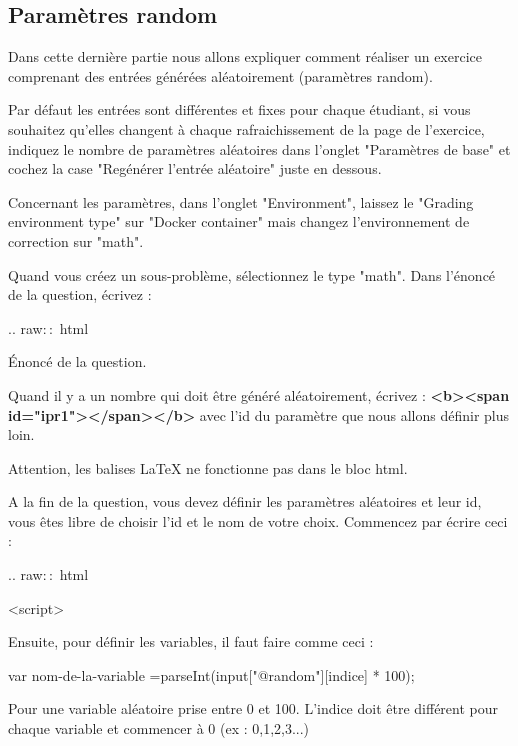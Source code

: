 \documentclass{article}
\begin{document}
\newpage
\subsection{Paramètres random}\label{random}

Dans cette dernière partie nous allons expliquer comment réaliser un exercice comprenant des entrées générées aléatoirement (paramètres random). 
\bigskip

Par défaut les entrées sont différentes et fixes pour chaque étudiant, si vous souhaitez qu'elles changent à chaque rafraichissement de la page de l'exercice, indiquez le nombre de paramètres aléatoires dans l'onglet "Paramètres de base" et cochez la case "Regénérer l'entrée aléatoire" juste en dessous.
\bigskip

Concernant les paramètres, dans l'onglet "Environment", laissez le "Grading environment type" sur "Docker container" mais changez l'environnement de correction sur "math". 

Quand vous créez un sous-problème, sélectionnez le type "math". Dans l'énoncé de la question, écrivez :
\bigskip

.. raw${::}$ html

\bigskip
\hspace{1cm} Énoncé de la question. 

\bigskip
Quand il y a un nombre qui doit être généré aléatoirement, écrivez : \textbf{<b><span id="ipr1"></span></b>} avec l'id du paramètre que nous allons définir plus loin. 

Attention, les balises LaTeX ne fonctionne pas dans le bloc html.

\bigskip

A la fin de la question, vous devez définir les paramètres aléatoires et leur id, vous êtes libre de choisir l'id et le nom de votre choix. Commencez par écrire ceci :
\bigskip

.. raw${::}$ html

\bigskip
\hspace{1cm} <script>

\bigskip
Ensuite, pour définir les variables, il faut faire comme ceci :
\bigskip

\hspace{2cm}var nom-de-la-variable =parseInt(input["@random"][indice] * 100);

\bigskip

Pour une variable aléatoire prise entre 0 et 100. L'indice doit être différent pour chaque variable et commencer à 0 (ex : 0,1,2,3...)
\end{document}
